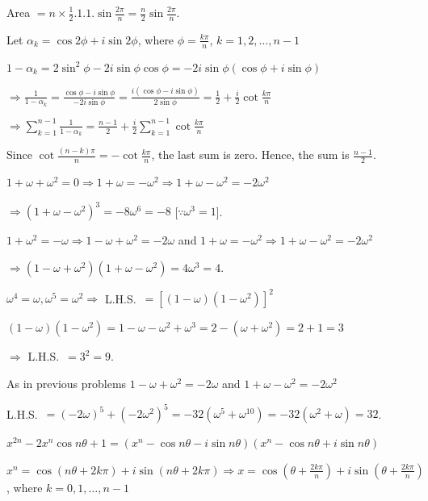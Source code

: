   Area $= n\times\frac{1}{2}.1.1.\sin\frac{2\pi}{n} = \frac{n}{2}\sin\frac{2\pi}{n}$.
\item Let $\alpha_k = \cos2\phi + i\sin2\phi$, where $\phi = \frac{k\pi}{n}$, $k = 1, 2, \ldots, n - 1$

  $1 - \alpha_k = 2\sin^2\phi - 2i\sin\phi\cos\phi = -2i\sin\phi(\cos\phi + i\sin\phi)$

  $\Rightarrow \frac{1}{1 - \alpha_k} = \frac{\cos\phi - i\sin\phi}{-2i\sin\phi} = \frac{i(\cos\phi -
    i\sin\phi)}{2\sin\phi} = \frac{1}{2} + \frac{i}{2}\cot\frac{k\pi}{n}$

  $\Rightarrow \sum_{k = 1}^{n - 1}\frac{1}{1 - \alpha_k} = \frac{n - 1}{2} + \frac{i}{2}\sum_{k = 1}^{n -
    1}\cot\frac{k\pi}{n}$

  Since $\cot\frac{(n - k)\pi}{n} = -\cot\frac{k\pi}{n}$, the last sum is zero. Hence, the sum is $\frac{n -
    1}{2}$.
\item $1 + \omega + \omega^2 = 0 \Rightarrow 1 + \omega = -\omega^2 \Rightarrow 1 + \omega - \omega^2 =
  -2\omega^2$

  $\Rightarrow (1 + \omega - \omega^2)^3 = -8\omega^6 = -8$ [$\because \omega^3 = 1$].
\item $1 + \omega^2 = -\omega \Rightarrow 1 - \omega + \omega^2 = -2\omega$ and $1 + \omega = -\omega^2
  \Rightarrow 1 + \omega - \omega^2 = -2\omega^2$

  $\Rightarrow (1 - \omega + \omega^2)(1 + \omega - \omega^2) = 4\omega^3 = 4$.
\item $\omega^4 = \omega, \omega^5 = \omega^2 \Rightarrow$ L.H.S.\ $= [(1 - \omega)(1 - \omega^2)]^2$

  $(1 - \omega)(1 - \omega^2) = 1 - \omega - \omega^2 + \omega^3 = 2 - (\omega + \omega^2) = 2 + 1 = 3$

  $\Rightarrow$ L.H.S.\ $= 3^2 = 9$.
\item As in previous problems $1 - \omega + \omega^2 = -2\omega$ and $1 + \omega - \omega^2 = -2\omega^2$

  L.H.S.\ $= (-2\omega)^5 + (-2\omega^2)^5 = -32(\omega^5 + \omega^{10}) = -32(\omega^2 + \omega) = 32$.
\item $x^{2n} - 2x^n\cos n\theta + 1 = (x^n - \cos n\theta - i\sin n\theta)(x^n - \cos n\theta + i\sin
  n\theta)$

  $x^n = \cos(n\theta + 2k\pi) + i\sin(n\theta + 2k\pi) \Rightarrow x = \cos\left(\theta +
  \frac{2k\pi}{n}\right) + i\sin\left(\theta + \frac{2k\pi}{n}\right)$, where $k = 0, 1, \ldots, n - 1$

